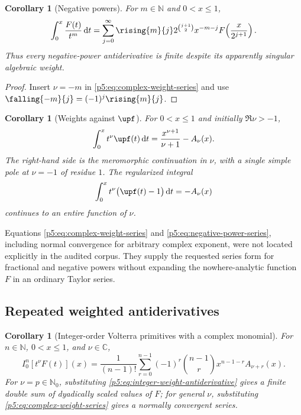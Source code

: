 \documentclass[11pt,oneside]{article}
\newtheorem{corollary}[theorem]{Corollary}
\theoremstyle{definition}
\theoremstyle{remark}
\newcommand{\C}{\mathbb C}
\newcommand{\N}{\mathbb N}
\newcommand{\dd}{\,\mathrm d}
\newcommand{\1}{\mathbf 1}
\begin{document}
\begin{corollary}[Negative powers]\label{p5:cor:negative-powers}
For $m\in\N$ and $0<x\le1$,
\begin{equation}\label{p5:eq:negative-power-series}
 \int_0^x\frac{F(t)}{t^m}\dd t
 =\sum_{j=0}^{\infty}\rising{m}{j}
 2^{\binom{j+1}{2}}x^{-m-j}
 F\!\left(\frac{x}{2^{j+1}}\right).
\end{equation}
Thus every negative-power antiderivative is finite despite its apparently singular algebraic weight.
\end{corollary}

\begin{proof}
Insert $\nu=-m$ in \eqref{p5:eq:complex-weight-series} and use
$\falling{-m}{j}=(-1)^j\rising{m}{j}$.
\end{proof}

\begin{corollary}[Weights against $\upf$]\label{p5:cor:up-complex-weight}
For $0<x\le1$ and initially $\Re\nu>-1$,
\begin{equation}\label{p5:eq:up-complex-weight}
 \int_0^x t^\nu\upf(t)\dd t
 =\frac{x^{\nu+1}}{\nu+1}-A_\nu(x).
\end{equation}
The right-hand side is the meromorphic continuation in $\nu$, with a single simple pole at $\nu=-1$ of residue $1$.  The regularized integral
\begin{equation}
 \int_0^x t^\nu\bigl(\upf(t)-1\bigr)\dd t=-A_\nu(x)
\end{equation}
continues to an entire function of $\nu$.
\end{corollary}

\newresultPartii Equations \eqref{p5:eq:complex-weight-series} and \eqref{p5:eq:negative-power-series}, including normal convergence for arbitrary complex exponent, were not located explicitly in the audited corpus.  They supply the requested series form for fractional and negative powers without expanding the nowhere-analytic function $F$ in an ordinary Taylor series.

\subsection{Repeated weighted antiderivatives}

\begin{corollary}[Integer-order Volterra primitives with a complex monomial]\label{p5:cor:weighted-nth-primitive}
For $n\in\N$, $0<x\le1$, and $\nu\in\C$,
\begin{equation}\label{p5:eq:weighted-nth-primitive}
 I_0^n[t^\nu F(t)](x)
 =\frac1{(n-1)!}\sum_{r=0}^{n-1}(-1)^r
 \binom{n-1}{r}x^{n-1-r}A_{\nu+r}(x).
\end{equation}
For $\nu=p\in\N_0$, substituting \eqref{p5:eq:integer-weight-antiderivative} gives a finite double sum of dyadically scaled values of $F$; for general $\nu$, substituting \eqref{p5:eq:complex-weight-series} gives a normally convergent series.
\end{corollary}
\end{document}
